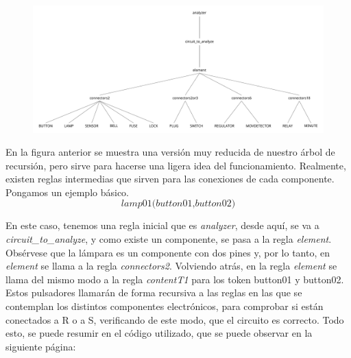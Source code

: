 \documentclass{article}
\begin{document}
\newpage


\begin{figure}[h!]
  \centering
  \includegraphics[scale=0.60]{Tree.pdf}
\end{figure}

En la figura anterior se muestra una versión muy reducida de nuestro árbol de recursión, pero sirve para hacerse una ligera idea del funcionamiento. Realmente, existen reglas intermedias que sirven para las conexiones de cada componente. Pongamos un ejemplo básico. $$\textit{lamp01(button01,button02)}$$

En este caso, tenemos una regla inicial que es \textit{analyzer}, desde aquí, se va a \textit{circuit\_to\_analyze}, y como existe un componente, se pasa a la regla \textit{element}. Obsérvese que la lámpara es un componente con dos pines y, por lo tanto, en \textit{element} se llama a la regla \textit{connectors2}. Volviendo atrás, en la regla \textit{element} se llama del mismo modo a la regla \textit{contentT1} para los token button01 y button02. Estos pulsadores llamarán de forma recursiva a las reglas en las que se contemplan los distintos componentes electrónicos, para comprobar si están conectados a R o a S, verificando de este modo, que el circuito es correcto. Todo esto, se puede resumir en el código utilizado, que se puede observar en la siguiente página:

\newpage
\end{document}
